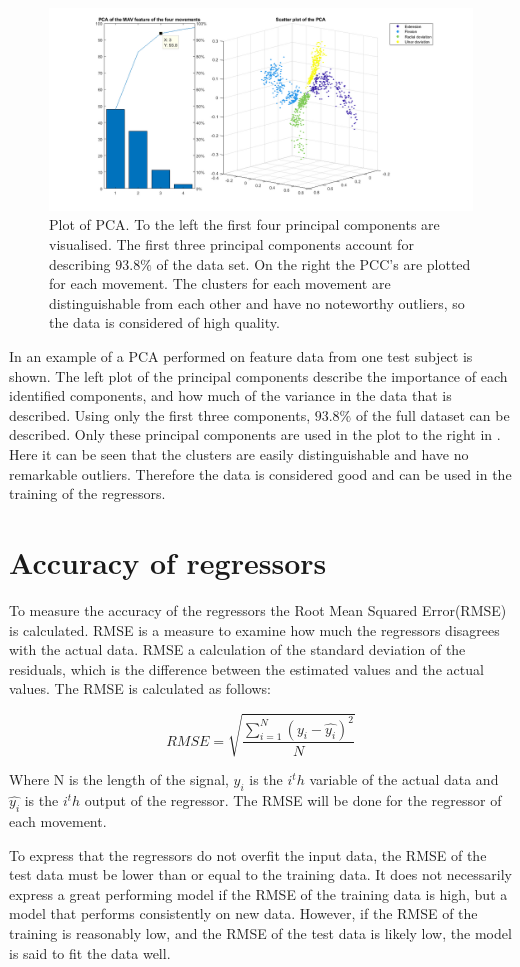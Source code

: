 \begin{figure}[H]
	\includegraphics[width=.4\textwidth]{figures/Methods/pcasubplot.png} 
	\caption{Plot of PCA. To the left the first four principal components are visualised. The first three principal components account for describing $93.8\%$ of the data set. On the right the PCC's are plotted for each movement. The clusters for each movement are distinguishable from each other and have no noteworthy outliers, so the data is considered of high quality.} 
	\label{fig:pcasubplot}
\end{figure} 

In  an example of a PCA performed on feature data from one test subject is shown. The left plot of the principal components describe the importance of each identified components, and how much of the variance in the data that is described. Using only the first three components, $93.8\%$ of the full dataset can be described. Only these principal components are used in the plot to the right in . Here it can be seen that the clusters are easily distinguishable and have no remarkable outliers. Therefore the data is considered good and can be used in the training of the regressors.


\section{Accuracy of regressors}
To measure the accuracy of the regressors the Root Mean Squared Error(RMSE) is calculated. RMSE is a measure to examine how much the regressors disagrees with the actual data. RMSE a calculation of the standard deviation of the residuals, which is the difference between the estimated values and the actual values. The RMSE is calculated as follows:

\begin{equation}
RMSE = \sqrt{\frac{\sum\limits_{i=1}^N(y_i - \hat{y_i})^2}{N}}
\end{equation}

Where N is the length of the signal, $y_i$ is the $i^th$ variable of the actual data and $\hat{y_i}$ is the $i^th$ output of the regressor. The RMSE will be done for the regressor of each movement.

To express that the regressors do not overfit the input data, the RMSE of the test data must be lower than or equal to the training data. It does not necessarily express a great performing model if the RMSE of the training data is high, but a model that performs consistently on new data. However, if the RMSE of the training is reasonably low, and the RMSE of the test data is likely low, the model is said to fit the data well. 


